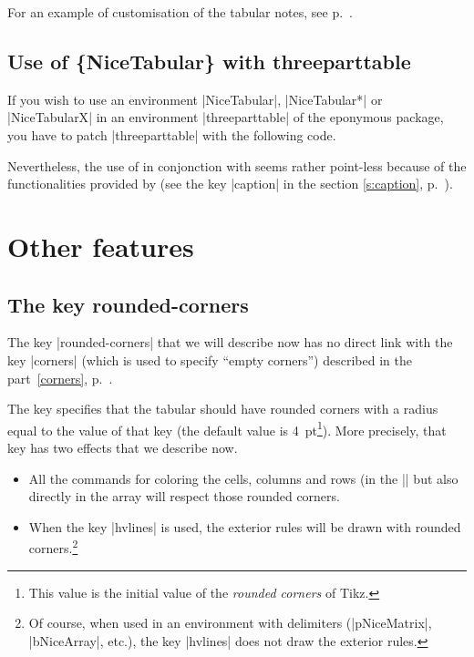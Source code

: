 \documentclass[dvipsnames]{article}%
\begin{document}

\bigskip
For an example of customisation of the tabular notes, see p.~\pageref{ex:notes}.


\subsection{Use of \{NiceTabular\} with threeparttable}


If you wish to use an environment |{NiceTabular}|, |{NiceTabular*}| or
|{NiceTabularX}| in an environment |{threeparttable}| of the eponymous package,
you have to patch |{threeparttable}| with the following code.

\begin{Code}
\makeatletter
{}
  {}
\makeatother
\end{Code}

Nevertheless, the use of  in conjonction with
 seems rather point-less because of the functionalities
provided by  (see the key |caption| in the section
\ref{s:caption}, p.~\pageref{s:caption}).


\section{Other features}

\subsection{The key rounded-corners}

\label{tabular-rounded-corners}

The key |rounded-corners| that we will describe now has no direct link with
the key |corners| (which is used to specify ``empty corners'') described in
the part~\ref{corners}, p.~\pageref{corners}.

\smallskip
The key  specifies that the tabular should have
rounded corners with a radius equal to the value of that key (the default value is
4~pt\footnote{This value is the initial value of the \emph{rounded corners} of
  Tikz.}). More precisely, that key has two effects that we describe now.
\begin{itemize}
\item All the commands for coloring the cells, columns and rows (in the
|\CodeBefore| but also directly in the array will respect those rounded corners. 

\item When the key |hvlines| is used, the exterior rules will be drawn with
rounded corners.\footnote{Of course, when used in an environment with delimiters
(|{pNiceMatrix}|, |{bNiceArray}|, etc.), the key |hvlines| does not draw the
exterior rules.}
\end{itemize}
\end{document}
